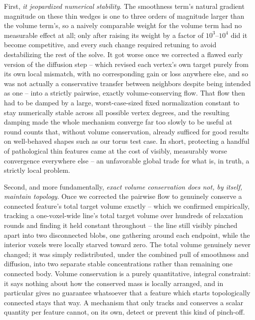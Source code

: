 \documentclass[journal]{vgtc}                     %
\begin{document}
First, \emph{it jeopardized numerical stability}. The smoothness term's natural gradient magnitude on these thin wedges is one to three orders of magnitude larger than the volume term's, so a naively comparable weight for the volume term had no measurable effect at all; only after raising its weight by a factor of $10^3$--$10^4$ did it become competitive, and every such change required retuning to avoid destabilizing the rest of the solve. It got worse once we corrected a flawed early version of the diffusion step -- which revised each vertex's own target purely from its own local mismatch, with no corresponding gain or loss anywhere else, and so was not actually a conservative transfer between neighbors despite being intended as one -- into a strictly pairwise, exactly volume-conserving flow. That flow then had to be damped by a large, worst-case-sized fixed normalization constant to stay numerically stable across all possible vertex degrees, and the resulting damping made the whole mechanism converge far too slowly to be useful at round counts that, without volume conservation, already sufficed for good results on well-behaved shapes such as our torus test case. In short, protecting a handful of pathological thin features came at the cost of visibly, measurably worse convergence everywhere else -- an unfavorable global trade for what is, in truth, a strictly local problem.

Second, and more fundamentally, \emph{exact volume conservation does not, by itself, maintain topology}. Once we corrected the pairwise flow to genuinely conserve a connected feature's total target volume exactly -- which we confirmed empirically, tracking a one-voxel-wide line's total target volume over hundreds of relaxation rounds and finding it held constant throughout -- the line still visibly pinched apart into two disconnected blobs, one gathering around each endpoint, while the interior voxels were locally starved toward zero. The total volume genuinely never changed; it was simply redistributed, under the combined pull of smoothness and diffusion, into two separate stable concentrations rather than remaining one connected body. Volume conservation is a purely quantitative, integral constraint: it says nothing about how the conserved mass is locally arranged, and in particular gives no guarantee whatsoever that a feature which starts topologically connected stays that way. A mechanism that only tracks and conserves a scalar quantity per feature cannot, on its own, detect or prevent this kind of pinch-off.
\end{document}
